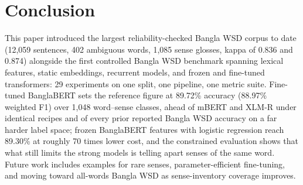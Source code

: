 \documentclass[conference]{IEEEtran}
\begin{document}
\section{Conclusion}
This paper introduced the largest reliability-checked Bangla WSD corpus to date (12,059 sentences, 402 ambiguous words, 1,085 sense glosses, kappa of 0.836 and 0.874) alongside the first controlled Bangla WSD benchmark spanning lexical features, static embeddings, recurrent models, and frozen and fine-tuned transformers: 29 experiments on one split, one pipeline, one metric suite. Fine-tuned BanglaBERT sets the reference figure at 89.72\% accuracy (88.97\% weighted F1) over 1,048 word--sense classes, ahead of mBERT and XLM-R under identical recipes and of every prior reported Bangla WSD accuracy on a far harder label space; frozen BanglaBERT features with logistic regression reach 89.30\% at roughly 70 times lower cost, and the constrained evaluation shows that what still limits the strong models is telling apart senses of the same word. Future work includes examples for rare senses, parameter-efficient fine-tuning, and moving toward all-words Bangla WSD as sense-inventory coverage improves.
\end{document}
